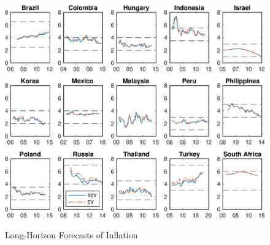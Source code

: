 \documentclass{article}
\begin{document}
\begin{figure}[tbph]
\caption{Long-Horizon Forecasts of Inflation} \label{fig:wnCPI}
\begin{center}								%
	\begin{minipage}{0.9\linewidth}
	\begin{center}							%
	\includegraphics[trim={0cm 0cm 0cm 0cm},clip,height=0.9\textheight,width=\linewidth]{../Figures/Surveys/wnCPI.eps} \\
	\end{center}
	\end{minipage}
\end{center}
\end{figure}
\end{document}
